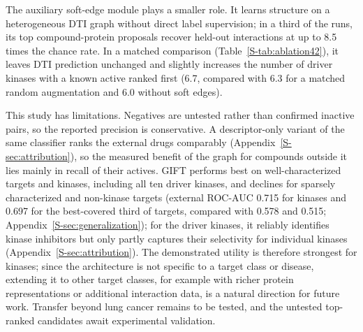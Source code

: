 \documentclass[10pt,letterpaper]{article}
\begin{document}
The auxiliary soft-edge module plays a smaller role. It learns structure on a heterogeneous DTI graph without direct label supervision; in a third of the runs, its top compound-protein proposals recover held-out interactions at up to 8.5 times the chance rate. In a matched comparison (Table~\ref{S-tab:ablation42}), it leaves DTI prediction unchanged and slightly increases the number of driver kinases with a known active ranked first (6.7, compared with 6.3 for a matched random augmentation and 6.0 without soft edges).

This study has limitations. Negatives are untested rather than confirmed inactive pairs, so the reported precision is conservative. A descriptor-only variant of the same classifier ranks the external drugs comparably (Appendix~\ref{S-sec:attribution}), so the measured benefit of the graph for compounds outside it lies mainly in recall of their actives. GIFT performs best on well-characterized targets and kinases, including all ten driver kinases, and declines for sparsely characterized and non-kinase targets (external ROC-AUC 0.715 for kinases and 0.697 for the best-covered third of targets, compared with 0.578 and 0.515; Appendix~\ref{S-sec:generalization}); for the driver kinases, it reliably identifies kinase inhibitors but only partly captures their selectivity for individual kinases (Appendix~\ref{S-sec:attribution}). The demonstrated utility is therefore strongest for kinases; since the architecture is not specific to a target class or disease, extending it to other target classes, for example with richer protein representations or additional interaction data, is a natural direction for future work. Transfer beyond lung cancer remains to be tested, and the untested top-ranked candidates await experimental validation.
\end{document}
